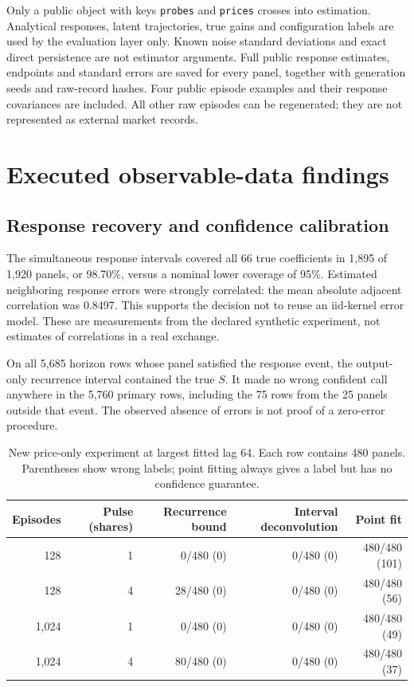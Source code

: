 \documentclass[11pt,a4paper]{article}
\theoremstyle{definition}
\theoremstyle{remark}
\begin{document}
Only a public object with keys \texttt{probes} and \texttt{prices} crosses into estimation. Analytical responses, latent trajectories, true gains and configuration labels are used by the evaluation layer only. Known noise standard deviations and exact direct persistence are not estimator arguments. Full public response estimates, endpoints and standard errors are saved for every panel, together with generation seeds and raw-record hashes. Four public episode examples and their response covariances are included. All other raw episodes can be regenerated; they are not represented as external market records.

\section{Executed observable-data findings}
\label{sec:observable_results}
\subsection{Response recovery and confidence calibration}
The simultaneous response intervals covered all 66 true coefficients in 1,895 of 1,920 panels, or 98.70\%, versus a nominal lower coverage of 95\%. Estimated neighboring response errors were strongly correlated: the mean absolute adjacent correlation was 0.8497. This supports the decision not to reuse an iid-kernel error model. These are measurements from the declared synthetic experiment, not estimates of correlations in a real exchange.

On all 5,685 horizon rows whose panel satisfied the response event, the output-only recurrence interval contained the true $S$. It made no wrong confident call anywhere in the 5,760 primary rows, including the 75 rows from the 25 panels outside that event. The observed absence of errors is not proof of a zero-error procedure.

\begin{table}[htbp]
\centering\small
\caption{New price-only experiment at largest fitted lag 64. Each row contains 480 panels. Parentheses show wrong labels; point fitting always gives a label but has no confidence guarantee.}
\label{tab:observable_primary}
\begin{tabular}{rr rrr}\toprule
Episodes & Pulse (shares) & Recurrence bound & Interval deconvolution & Point fit\\\midrule
128 & 1 & 0/480 (0) & 0/480 (0) & 480/480 (101)\\
128 & 4 & 28/480 (0) & 0/480 (0) & 480/480 (56)\\
1,024 & 1 & 0/480 (0) & 0/480 (0) & 480/480 (49)\\
1,024 & 4 & 80/480 (0) & 0/480 (0) & 480/480 (37)\\\bottomrule
\end{tabular}
\end{table}
\end{document}
